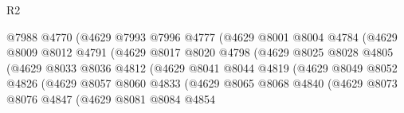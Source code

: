 \begin{lexlean}{R2}
\begin{coremodule}
                                  @7988
                                  @4770
                                  (@4629
                                    @7993
                                    @7996
                                    @4777
                                    (@4629
                                      @8001
                                      @8004
                                      @4784
                                      (@4629
                                        @8009
                                        @8012
                                        @4791
                                        (@4629
                                          @8017
                                          @8020
                                          @4798
                                          (@4629
                                            @8025
                                            @8028
                                            @4805
                                            (@4629
                                              @8033
                                              @8036
                                              @4812
                                              (@4629
                                                @8041
                                                @8044
                                                @4819
                                                (@4629
                                                  @8049
                                                  @8052
                                                  @4826
                                                  (@4629
                                                    @8057
                                                    @8060
                                                    @4833
                                                    (@4629
                                                      @8065
                                                      @8068
                                                      @4840
                                                      (@4629
                                                        @8073
                                                        @8076
                                                        @4847
                                                        (@4629
                                                          @8081
                                                          @8084
                                                          @4854

\end{coremodule}
\end{lexlean}

